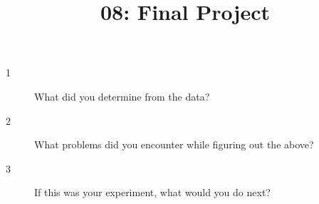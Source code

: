 \documentclass[10pt]{amsart}
\title{08: Final Project}
\begin{document}
\maketitle

\begin{description}
\item[1] What did you determine from the data?
\vspace{0.75in}

\item[2] What problems did you encounter while figuring out the above?
\vspace{0.75in}

\item[3] If this was your experiment, what would you do next?
\vspace{0.75in}
\end{description}
\end{document}
